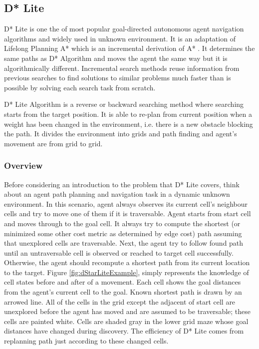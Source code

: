 
\subsection{D* Lite}

D* Lite \cite{Koenig:2002} is one the of most popular goal-directed autonomous agent navigation algorithms and widely used in unknown environment. It is an adaptation of Lifelong Planning A* \cite{LPAStarKoenig:2004} which is an incremental derivation of A* \cite{AStarHart:1968}. It determines the same paths as D* Algorithm \cite{DStar:1994} and moves the agent the same way but it is algorithmically different. Incremental search methods reuse information from previous searches to find solutions to similar problems much faster than is possible by solving each search task from scratch.

D* Lite Algorithm is a reverse or backward searching method where searching starts from the target position. It is able to re-plan from current position when a weight has been changed in the environment, i.e. there is a new obstacle blocking the path. It divides the environment into grids and path finding and agent's movement are from grid to grid.

\subsubsection{Overview}

Before considering an introduction to the problem that D* Lite covers, think about an agent path planning and navigation task in a dynamic unknown environment. In this scenario, agent always observes its current cell's neighbour cells and try to move one of them if it is traversable. Agent starts from start cell and moves through to the goal cell. It always try to compute the shortest (or minimized some other cost metric as determined by edge cost) path assuming that unexplored cells are traversable. Next, the agent try to follow found path until an untraversable cell is observed or reached to target cell successfully. Otherwise, the agent should recompute a shortest path from its current location to the target. Figure \ref{fig:dStarLiteExample}, simply represents the knowledge of cell states before and after of a movement. Each cell shows the goal distances from the agent's current cell to the goal. Known shortest path is drawn by an arrowed line. All of the cells in the grid except the adjacent of start cell are unexplored before the agent has moved and are assumed to be traversable; these cells are painted white. Cells are shaded gray in the lower grid maze whose goal distances have changed during discovery. The efficiency of D* Lite comes from replanning path just according to these changed cells.

